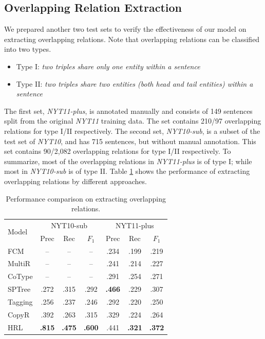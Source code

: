 \documentclass[letterpaper]{article}
\theoremstyle{definition}
\begin{document}
\subsection{Overlapping Relation Extraction}


We prepared another two test sets to verify the effectiveness of our model on extracting overlapping relations. Note that overlapping relations can be classified into two types.
\begin{itemize}
    \item Type I: {\it two triples share only one entity within a sentence}
    \item Type II: {\it two triples share two entities (both head and tail entities) within a sentence}
\end{itemize}
The first set,
\textit{NYT11-plus}, is annotated manually and consists of 149 sentences split from the original \textit{NYT11} training data. The set contains 210/97 overlapping relations for type I/II respectively.
The second set,
\textit{NYT10-sub}, is a subset of the test set of \textit{NYT10}, and has 715 sentences, but without manual annotation. This set contains 90/2,082 overlapping relations for type I/II respectively. To summarize, most of the overlapping relations in \textit{NYT11-plus} is of type I; while most in \textit{NYT10-sub} is of type II.
Table \ref{overlapping} shows the performance of extracting overlapping relations by different approaches.

\begin{table}[!htb]
    \centering
    \begin{tabular}{lcccccc}
    \toprule
        \multirow{2}{*}{Model} & \multicolumn{3}{c}{NYT10-sub} & \multicolumn{3}{c}{NYT11-plus}  \\
        & Prec & Rec & $F_1$ & Prec & Rec & $F_1$ \\
    \midrule
        FCM    & -- & -- & -- & .234 & .199 & .219 \\
        MultiR & -- & -- & -- & .241 & .214 & .227 \\
        CoType & -- & -- & -- & .291 & .254 & .271 \\
        SPTree & .272 & .315 & .292 & \textbf{.466} & .229 & .307 \\
        Tagging & .256 & .237 & .246 & .292 & .220 & .250 \\
        CopyR & .392 & .263 & .315 & .329 & .224 & .264 \\
    \midrule
        HRL    & \textbf{.815} & \textbf{.475} & \textbf{.600} & .441 & \textbf{.321} & \textbf{.372} \\
    \bottomrule
    \end{tabular}
    \caption{Performance comparison on extracting overlapping relations.}
    \label{overlapping}
\end{table} %
\end{document}
